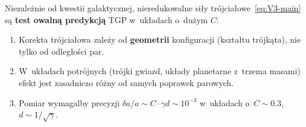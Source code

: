 \begin{remark}
Niezale\.znie od kwestii galaktycznej, nieredukowalne si\l{}y
tr\'ojcia\l{}owe~\eqref{eq:V3-main} s\k{a} \textbf{test owaln\k{a}
predykcj\k{a}} TGP w~uk\l{}adach o~du\.zym $C$:
\begin{enumerate}[nosep]
  \item Korekta tr\'ojcia\l{}owa zale\.zy od \textbf{geometrii}
    konfiguracji (kszta\l{}tu tr\'ojk\k{a}ta), nie tylko
    od odleg\l{}o\'sci par.
  \item W~uk\l{}adach potr\'ojnych (tr\'ojki gwiazd,
    uk\l{}ady planetarne z~trzema masami) efekt jest zasadniczo
    r\'o\.zny od samych poprawek parowych.
  \item Pomiar wymagalby precyzji $\delta a/a \sim C \cdot
    \gamma d \sim 10^{-3}$ w~uk\l{}adach o~$C \sim 0.3$,
    $d \sim 1/\sqrt{\gamma}$.
\end{enumerate}
\end{remark}
